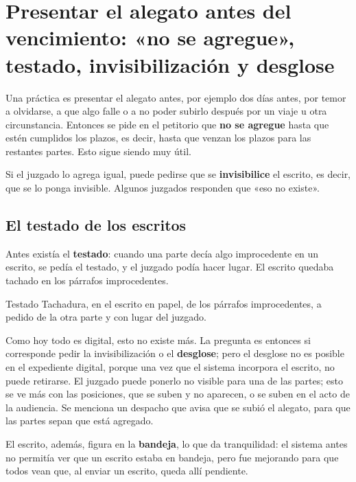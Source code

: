 \documentclass[12pt,oneside]{book}
\begin{document}
\section{Presentar el alegato antes del vencimiento: «no se agregue», testado, invisibilización y desglose}

Una práctica es presentar el alegato antes, por ejemplo dos días antes, por temor a olvidarse, a que algo falle o a no poder subirlo después por un viaje u otra circunstancia. Entonces se pide en el petitorio que \textbf{no se agregue} hasta que estén cumplidos los plazos, es decir, hasta que venzan los plazos para las restantes partes. Esto sigue siendo muy útil.

Si el juzgado lo agrega igual, puede pedirse que se \textbf{invisibilice} el escrito, es decir, que se lo ponga invisible. Algunos juzgados responden que «eso no existe».

\subsection{El testado de los escritos}

Antes existía el \textbf{testado}: cuando una parte decía algo improcedente en un escrito, se pedía el testado, y el juzgado podía hacer lugar. El escrito quedaba tachado en los párrafos improcedentes.

\begin{definition}{Testado}
Tachadura, en el escrito en papel, de los párrafos improcedentes, a pedido de la otra parte y con lugar del juzgado.
\end{definition}

Como hoy todo es digital, esto no existe más. La pregunta es entonces si corresponde pedir la invisibilización o el \textbf{desglose}; pero el desglose no es posible en el expediente digital, porque una vez que el sistema incorpora el escrito, no puede retirarse. El juzgado puede ponerlo no visible para una de las partes; esto se ve más con las posiciones, que se suben y no aparecen, o se suben en el acto de la audiencia. Se menciona un despacho que avisa que se subió el alegato, para que las partes sepan que está agregado.

El escrito, además, figura en la \textbf{bandeja}, lo que da tranquilidad: el sistema antes no permitía ver que un escrito estaba en bandeja, pero fue mejorando para que todos vean que, al enviar un escrito, queda allí pendiente.
\end{document}
